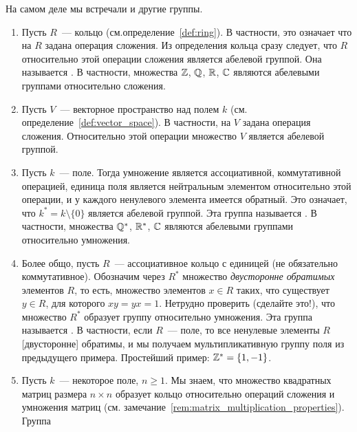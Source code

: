 На самом деле мы встречали и другие группы.

\begin{examples}\label{examples:group}
\hspace{1em}
\begin{enumerate}
\item Пусть $R$~--- кольцо (см.определение~\ref{def:ring}). В
  частности, это
  означает что на $R$ задана операция сложения. Из определения кольца
  сразу следует, что $R$ относительно этой операции сложения является
  абелевой группой. Она называется . В
  частности, множества $\mathbb Z$, $\mathbb Q$, $\mathbb R$, $\mathbb C$ являются
  абелевыми группами относительно сложения.
\item Пусть $V$~--- векторное пространство над полем $k$
  (см. определение~\ref{def:vector_space}). В частности, на $V$ задана
  операция сложения. Относительно этой операции множество $V$ является
  абелевой группой.
\item\label{item:group_of_units_of_a_field}
  Пусть $k$~--- поле. Тогда умножение является ассоциативной,
  коммутативной операцией, единица поля является нейтральным элементом
  относительно этой операции, и у каждого ненулевого элемента имеется
  обратный. Это означает, что $k^* = k\setminus\{0\}$ является
  абелевой группой. Эта группа называется . В
  частности, множества $\mathbb Q^*$, $\mathbb R^*$, $\mathbb C$ являются
  абелевыми группами относительно умножения.
\item\label{item:group_of_units} Более общо, пусть $R$~---
  ассоциативное кольцо с единицей (не
  обязательно коммутативное). Обозначим через $R^*$ множество
  {\em двусторонне обратимых} элементов $R$, то есть, множество
  элементов $x\in R$ таких, что существует $y\in R$, для которого
  $xy=yx=1$. Нетрудно проверить (сделайте это!), что множество $R^*$
  образует группу относительно умножения. Эта группа называется
  . В частности, если $R$~--- поле, то все
  ненулевые элементы $R$ [двусторонне] обратимы, и мы получаем
  мультипликативную группу поля из предыдущего примера. Простейший
  пример: $\mathbb Z^* = \{1,-1\}$.
\item Пусть $k$~--- некоторое поле, $n\geq 1$. Мы знаем, что множество
  квадратных матриц размера $n\times n$ образует кольцо относительно
  операций сложения и умножения матриц
  (см. замечание~\ref{rem:matrix_multiplication_properties}). Группа

\end{enumerate}
\end{examples}
